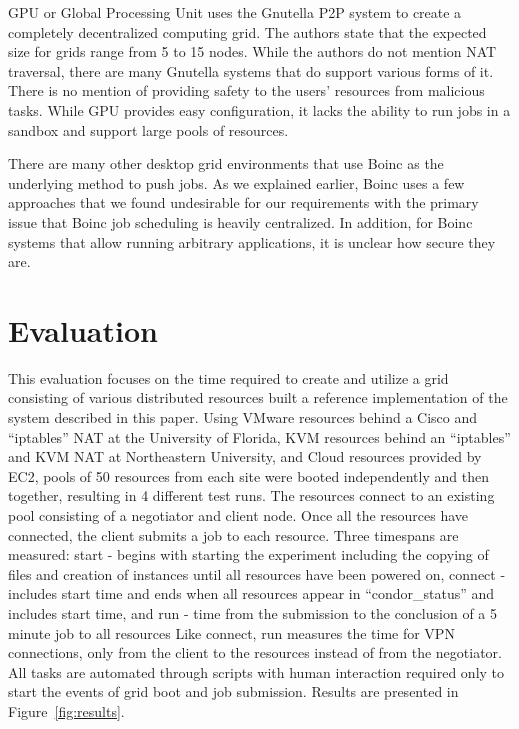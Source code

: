 \documentclass{sig-alternate}
\begin{document}
GPU or Global Processing Unit uses the Gnutella P2P system to create a
completely decentralized computing grid.  The authors state that the expected
size for grids range from 5 to 15 nodes.  While the authors do not mention NAT
traversal, there are many Gnutella systems that do support various forms of it.
There is no mention of providing safety to the users' resources from malicious
tasks.  While GPU provides easy configuration, it lacks the ability to run
jobs in a sandbox and support large pools of resources.

There are many other desktop grid environments that use Boinc as the underlying
method to push jobs.  As we explained earlier, Boinc uses a few approaches that
we found undesirable for our requirements with the primary issue that Boinc job
scheduling is heavily centralized.  In addition, for Boinc systems that allow
running arbitrary applications, it is unclear how secure they are.

\section{Evaluation}
\label{evaluation}
This evaluation focuses on the time required to create and utilize a grid
consisting of various distributed resources built a reference implementation of
the system described in this paper.  Using VMware resources behind a Cisco
and ``iptables'' NAT at the University of Florida, KVM resources behind an
``iptables'' and KVM NAT at Northeastern University, and Cloud resources
provided by EC2, pools of 50 resources from each site were booted independently
and then together, resulting in 4 different test runs.  The resources
connect to an existing pool consisting of a negotiator and client node.  Once
all the resources have connected, the client submits a job to each resource.
Three timespans are measured:  start - begins with starting the experiment
including the copying of files and creation of instances until all resources
have been powered on, connect - includes start time and ends when all resources
appear in ``condor\_status'' and includes start time, and run - time from the
submission to the conclusion of a 5 minute job to all resources Like connect,
run measures the time for VPN connections, only from the client to the resources
instead of from the negotiator.  All tasks are automated through scripts with
human interaction required only to start the events of grid boot and job
submission.  Results are presented in Figure~\ref{fig:results}.
\end{document}
